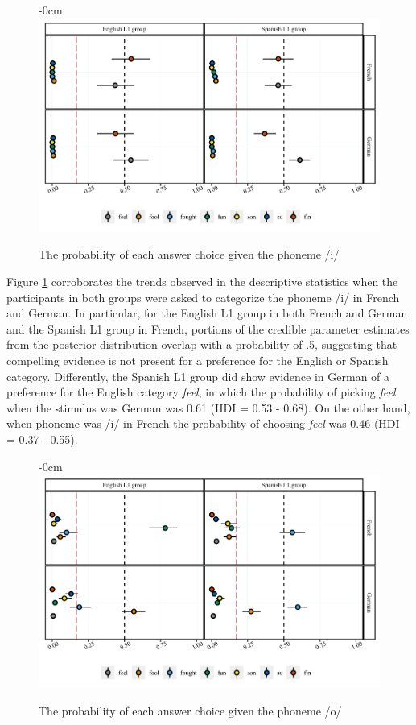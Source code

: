 \documentclass[preprints]{Definitions/mdpi}
\begin{document}
\begin{figure}[H]
\begin{adjustwidth}{-\extralength}{0cm}
\centering
\includegraphics[width=13.5cm]{figs/i_full.png}
\end{adjustwidth}
\caption{The probability of each answer choice given the phoneme /i/ \label{i_mod}}
\end{figure}

Figure \ref{i_mod} corroborates the trends observed in the descriptive statistics when the participants in both groups were asked to categorize the phoneme /i/ in French and German.
In particular, for the English L1 group in both French and German and the Spanish L1 group in French, portions of the credible parameter estimates from the posterior distribution overlap with a probability of .5, suggesting that compelling evidence is not present for a preference for the English or Spanish category.
Differently, the Spanish L1 group did show evidence in German of a preference for the English category \emph{feel}, in which the probability of picking \emph{feel} when the stimulus was German was 0.61 (HDI = 0.53 - 0.68).
On the other hand, when phoneme was /i/ in French the probability of choosing \emph{feel} was 0.46 (HDI = 0.37 - 0.55).

\begin{figure}[H]
\begin{adjustwidth}{-\extralength}{0cm}
\centering
\includegraphics[width=13.5cm]{figs/o_full.png}
\end{adjustwidth}
\caption{The probability of each answer choice given the phoneme /o/ \label{o_mod}}
\end{figure}
\end{document}
